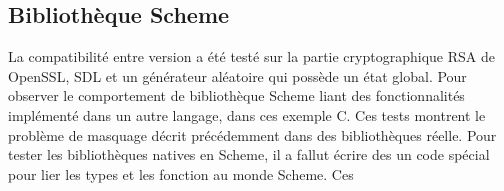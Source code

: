 %
%
%
%



\clearpage
\subsection{Bibliothèque Scheme}
La compatibilité entre version a été testé sur la partie cryptographique
RSA de OpenSSL, SDL et un générateur aléatoire qui possède un état global.
Pour observer le comportement de bibliothèque Scheme liant des fonctionnalités
implémenté dans un autre langage, dans ces exemple C. Ces tests montrent le problème
de masquage décrit précédemment dans des bibliothèques réelle.
Pour tester les bibliothèques natives en Scheme, il a fallut écrire des
un code spécial pour lier les types et les fonction au monde Scheme. Ces

